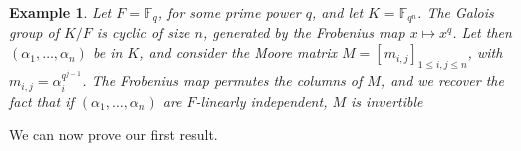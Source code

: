 \documentclass[12pt]{article}
\theoremstyle{plain}
\newtheorem{theorem}{Theorem}
\newtheorem{example}[theorem]{Example}
\newcommand{\F}{\ensuremath{\mathbb{F}}}
\begin{document}
\begin{example}\label{ex:Moore}
  Let $F=\F_q$, for some prime power $q$, and let $K=\F_{q^n}$.  The
  Galois group of $K/F$ is cyclic of size $n$, generated by the Frobenius
  map $x \mapsto x^q$. Let then $(\alpha_1,\dots,\alpha_n)$ be in $K$,
  and consider the {\em Moore matrix} $M=[m_{i,j}]_{1 \le i,j \le n}$, with
  $m_{i,j} = \alpha_i^{q^{j-1}}$. The Frobenius map permutes the
  columns of $M$, and we recover the fact that if
  $(\alpha_1,\dots,\alpha_n)$ are $F$-linearly independent, $M$ is
  invertible~\cite[Corollary~1.3.4]{Goss}
\end{example}


We can now prove our first result.

\end{document}
